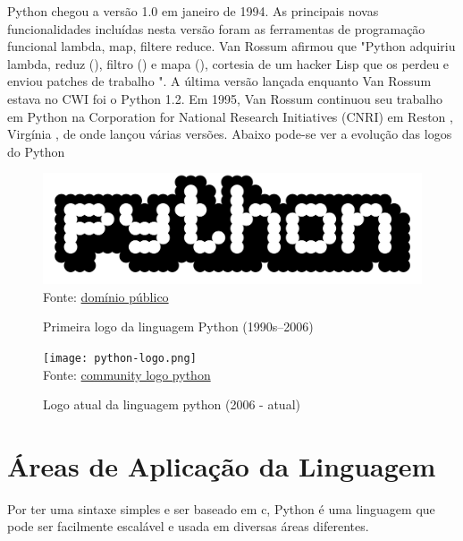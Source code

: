         Python chegou a versão 1.0 em janeiro de 1994. As principais novas funcionalidades incluídas nesta versão foram as ferramentas de programação funcional lambda, map, filtere reduce. Van Rossum afirmou que "Python adquiriu lambda, reduz (), filtro () e mapa (), cortesia de um hacker Lisp que os perdeu e enviou patches de trabalho ". \cite{Int02}
        A última versão lançada enquanto Van Rossum estava no CWI foi o Python 1.2. Em 1995, Van Rossum continuou seu trabalho em Python na Corporation for National Research Initiatives (CNRI) em Reston , Virgínia , de onde lançou várias versões. Abaixo pode-se ver a evolução das logos do Python
        
    \begin{figure}[H]
    \begin{center}
        \caption{Primeira logo da linguagem Python (1990s–2006)} \label{ling1}
        \includegraphics[width=12cm]{Pictures/primeira-logo-python.png} \\
        {\tiny \sf Fonte: \href{https://commons.wikimedia.org/wiki/File:Python_logo_1990s.svg}{domínio público} }
    \end{center}
   \end{figure}
   

   \begin{figure}[H]
    \begin{center}
        \caption{Logo atual da linguagem python (2006 - atual)} \label{ling1}
        \texttt{[image: python-logo.png]} \\
        {\tiny \sf Fonte: \href{https://www.python.org/community/logos/}{community logo python} }
    \end{center}
   \end{figure}

   \section{\'{A}reas de Aplica\c{c}\~{a}o da Linguagem}
   
   Por ter uma sintaxe simples e ser baseado em c, Python é uma linguagem que pode ser facilmente escalável e usada em diversas áreas diferentes.
   
